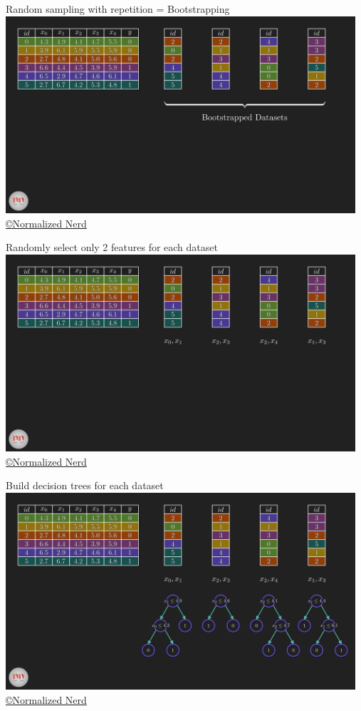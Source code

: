 \documentclass[handout, 10pt]{beamer}
\begin{document}
\begin{frame}{Random sampling with repetition = Bootstrapping}
\hspace*{-1cm}\includegraphics[width=13cm]{figs/rf/_3-30 screenshot.png}
{\tiny \href{https://www.youtube.com/watch?v=ZVR2Way4nwQ}{ \copyright Normalized Nerd}}
\end{frame}

\begin{frame}{Randomly select only 2 features for each dataset}
\hspace*{-1cm}\includegraphics[width=13cm]{figs/rf/_4-2 screenshot.png}
{\tiny \href{https://www.youtube.com/watch?v=ZVR2Way4nwQ}{ \copyright Normalized Nerd}}
\end{frame}

\begin{frame}{Build decision trees for each dataset}
\hspace*{-1cm}\includegraphics[width=13cm]{figs/rf/_4-35 screenshot.png}
{\tiny \href{https://www.youtube.com/watch?v=ZVR2Way4nwQ}{ \copyright Normalized Nerd}}
\end{frame}
\end{document}
